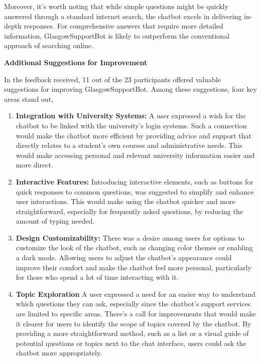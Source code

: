 \documentclass{l4proj}
\begin{document}
Moreover, it's worth noting that while simple questions might be quickly answered through a standard internet search, the chatbot excels in delivering in-depth responses. For comprehensive answers that require more detailed information, GlasgowSupportBot is likely to outperform the conventional approach of searching online. 

\textbf{Additional Suggestions for Improvement}

In the feedback received, 11 out of the 23 participants offered valuable suggestions for improving GlasgowSupportBot. Among these suggestions, four key areas stand out,

\begin{enumerate}
    \item \textbf{Integration with University Systems:} A user expressed a wish for the chatbot to be linked with the university's login systems. Such a connection would make the chatbot more efficient by providing advice and support that directly relates to a student's own courses and administrative needs. This would make accessing personal and relevant university information easier and more direct.
    
    \item \textbf{Interactive Features:}  Introducing interactive elements, such as buttons for quick responses to common questions, was suggested to simplify and enhance user interactions. This would make using the chatbot quicker and more straightforward, especially for frequently asked questions, by reducing the amount of typing needed. 
    
    \item \textbf{Design Customizability:} There was a desire among users for options to customize the look of the chatbot, such as changing color themes or enabling a dark mode. Allowing users to adjust the chatbot’s appearance could improve their comfort and make the chatbot feel more personal, particularly for those who spend a lot of time interacting with it.

    \item  \textbf{Topic Exploration} A user expressed a need for an easier way to understand which questions they can ask, especially since the chatbot's support services are limited to specific areas. There's a call for improvements that would make it clearer for users to identify the scope of topics covered by the chatbot. By providing a more straightforward method, such as a list or a visual guide of potential questions or topics next to the chat interface, users could ask the chatbot more appropriately. 
\end{enumerate}
\end{document}
